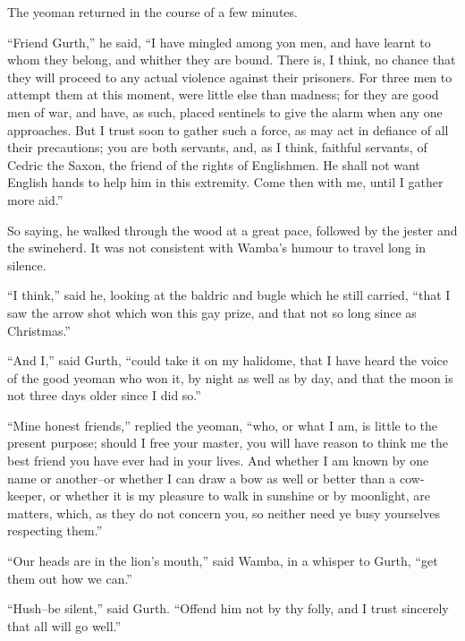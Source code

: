 The yeoman returned in the course of a few minutes.

``Friend Gurth,'' he said, ``I have mingled among yon men, and have
learnt to whom they belong, and whither they are bound. There is, I
think, no chance that they will proceed to any actual violence against
their prisoners. For three men to attempt them at this moment, were
little else than madness; for they are good men of war, and have, as
such, placed sentinels to give the alarm when any one approaches. But I
trust soon to gather such a force, as may act in defiance of all their
precautions; you are both servants, and, as I think, faithful servants,
of Cedric the Saxon, the friend of the rights of Englishmen. He shall
not want English hands to help him in this extremity. Come then with me,
until I gather more aid.''

So saying, he walked through the wood at a great pace, followed by the
jester and the swineherd. It was not consistent with Wamba's humour to
travel long in silence.

``I think,'' said he, looking at the baldric and bugle which he still
carried, ``that I saw the arrow shot which won this gay prize, and that
not so long since as Christmas.''

``And I,'' said Gurth, ``could take it on my halidome, that I have heard
the voice of the good yeoman who won it, by night as well as by day, and
that the moon is not three days older since I did so.''

``Mine honest friends,'' replied the yeoman, ``who, or what I am, is
little to the present purpose; should I free your master, you will have
reason to think me the best friend you have ever had in your lives. And
whether I am known by one name or another--or whether I can draw a bow
as well or better than a cow-keeper, or whether it is my pleasure to
walk in sunshine or by moonlight, are matters, which, as they do not
concern you, so neither need ye busy yourselves respecting them.''

``Our heads are in the lion's mouth,'' said Wamba, in a whisper to
Gurth, ``get them out how we can.''

``Hush--be silent,'' said Gurth. ``Offend him not by thy folly, and I
trust sincerely that all will go well.''
